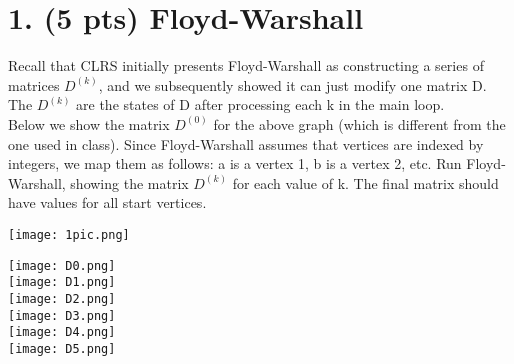 \documentclass[12pt]{article}
\begin{document}
\section*{1. (5 pts) Floyd-Warshall}
Recall that CLRS initially presents Floyd-Warshall as constructing a series of matrices $D^{(k)}$, and we subsequently showed it can just modify one matrix D. The $D^{(k)}$ are the states of D after processing each k in the main loop. \\
\linebreak
Below we show the matrix $D^{(0)}$ for the above graph (which is different from the one used in class). Since Floyd-Warshall assumes that vertices are indexed by integers, we map them as follows: a is a vertex 1, b is a vertex 2, etc. Run Floyd-Warshall, showing the matrix $D^{(k)}$ for each value of k. The final matrix should have values for all start vertices. \\
\linebreak
\begin{center}
\texttt{[image: 1pic.png]}\\
\end{center}
\linebreak
\begin{center}
\texttt{[image: D0.png]} \\
\texttt{[image: D1.png]} \\
\texttt{[image: D2.png]} \\
\texttt{[image: D3.png]} \\
\texttt{[image: D4.png]} \\
\texttt{[image: D5.png]} \\
\end{center}
\end{document}
